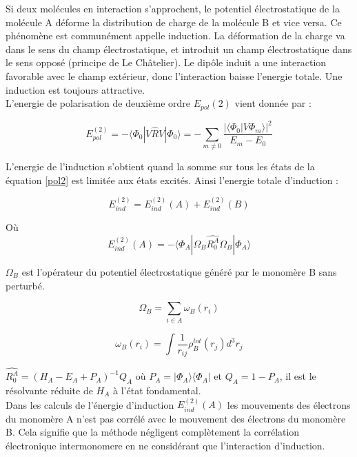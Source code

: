 Si deux molécules en interaction s'approchent, le potentiel électrostatique de la molécule A déforme la distribution de charge de la molécule B et vice versa. Ce phénomène est communément appelle induction. La déformation de la charge va dans le sens du champ électrostatique, et introduit un champ électrostatique dans le sens opposé (principe de Le Ch\^{a}telier).  Le dipôle induit a une interaction favorable avec le champ extérieur, donc l'interaction baisse l'energie totale. Une induction est toujours attractive.\\

L'energie de polarisation de deuxième ordre $E_{pol}(2)$ vient donnée par :

\begin{equation}
E_{pol}^{(2)} = - \langle \Phi_{0}| V \hat{R}V| \Phi_{0}\rangle = - \sum_{m \neq 0} \frac{|\langle \Phi_{0}|V \Phi_{m}\rangle|^{2}}{E_{m} - E_{0}} \label{pol2}
\end{equation}

L'energie de l'induction s'obtient quand la somme sur tous les états de la équation \ref{pol2} est limitée aux états excités. Ainsi l'energie totale d'induction : 

\begin{equation}
E_{ind}^{(2)} = E_{ind}^{(2)}(A) + E_{ind}^{(2)}(B) \label{ind}
\end{equation}
		
Où  \begin{equation}
E_{ind}^{(2)}(A) = -\langle \Phi_{A}|\Omega_{B}\hat{R_{0}^{A}}\Omega_{B}| \Phi_{A} \rangle  \label{indA}
\end{equation}		

$\Omega_{B}$ est l'opérateur du potentiel électrostatique généré par le monomère B sans perturbé. 

\begin{equation}
\Omega_{B} = \sum_{i\in A} \omega_{B}(r_{i})
\end{equation}

\begin{equation}
\omega_{B}(r_{i}) = \int \frac{1}{r_{ij}} \rho_{B}^{tot}(r_{j}) d^{3}r_{j}
\end{equation}

$\hat{R_{0}^{A}} = (H_{A}- E_{A} + P_{A})^{-1}Q_{A}$ où $P_{A} = |\Phi_{A}\rangle \langle \Phi_{A}|$ et $Q_{A} = 1- P_{A}$, il est le résolvante réduite de $H_{A}$ à l'état fondamental.\\


Dans les calculs de l'énergie d'induction $E_{ind}^{(2)}(A)$ les mouvements des électrons du monomère A n'est pas corrélé avec le mouvement des électrons du monomère B. Cela signifie que la méthode négligent complètement la corrélation électronique intermonomere en ne considérant que l'interaction d'induction.  

